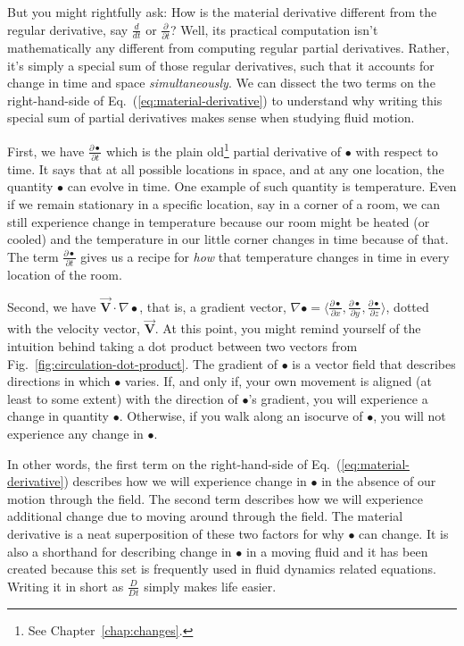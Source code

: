 But you might rightfully ask: How is the material derivative different from the regular derivative, say $\frac{d}{dt}$ or $\frac{\partial}{\partial t}$? Well, its practical computation isn't mathematically any different from computing regular partial derivatives. Rather, it's simply a special sum of those regular derivatives, such that it accounts for change in time and space \textit{simultaneously}. We can dissect the two terms on the right-hand-side of Eq.~(\ref{eq:material-derivative}) to understand why writing this special sum of partial derivatives makes sense when studying fluid motion.

First, we have $\frac{\partial \bullet}{\partial t}$ which is the plain old\footnote{See Chapter~\ref{chap:changes}.} partial derivative of $\bullet$ with respect to time. It says that at all possible locations in space, and at any one location, the quantity $\bullet$ can evolve in time. One example of such quantity is temperature. Even if we remain stationary in a specific location, say in a corner of a room, we can still experience change in temperature because our room might be heated (or cooled) and the temperature in our little corner changes in time because of that. The term $\frac{\partial \bullet}{\partial t}$ gives us a recipe for \textit{how} that temperature changes in time in every location of the room.

Second, we have $\vec{\bm{V}} \cdot \nabla \bullet$, that is, a gradient vector, $\nabla \bullet = \langle \frac{\partial \bullet}{\partial x}, \frac{\partial \bullet}{\partial y}, \frac{\partial \bullet}{\partial z} \rangle$, dotted with the velocity vector, $\vec{\bm{V}}$. At this point, you might remind yourself of the intuition behind taking a dot product between two vectors from Fig.~\ref{fig:circulation-dot-product}. The gradient of $\bullet$ is a vector field that describes directions in which $\bullet$ varies. If, and only if, your own movement is aligned (at least to some extent) with the direction of $\bullet$'s gradient, you will experience a change in quantity $\bullet$. Otherwise, if you walk along an isocurve of $\bullet$, you will not experience any change in $\bullet$.

In other words, the first term on the right-hand-side of Eq.~(\ref{eq:material-derivative}) describes how we will experience change in $\bullet$ in the absence of our motion through the field. The second term describes how we will experience additional change due to moving around through the field. The material derivative is a neat superposition of these two factors for why $\bullet$ can change. It is also a shorthand for describing change in $\bullet$ in a moving fluid and it has been created because this set is frequently used in fluid dynamics related equations. Writing it in short as $\frac{D}{D t}$ simply makes life easier.

